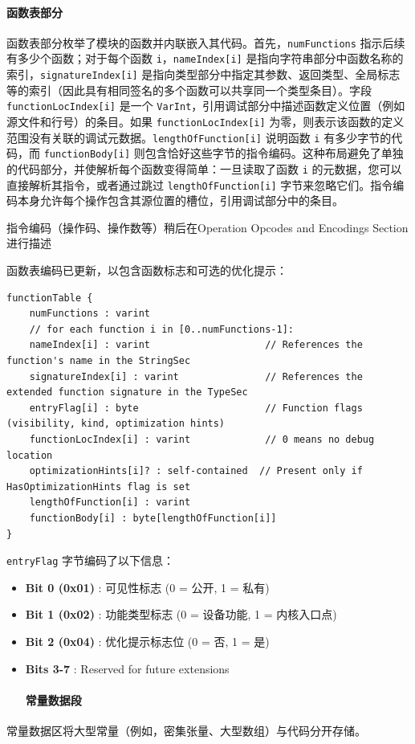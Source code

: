 \documentclass{article}
\begin{document}
\paragraph{函数表部分}

函数表部分枚举了模块的函数并内联嵌入其代码。首先，\texttt{numFunctions} 指示后续有多少个函数；对于每个函数 \texttt{i}，\texttt{nameIndex[i]} 是指向字符串部分中函数名称的索引，\texttt{signatureIndex[i]} 是指向类型部分中指定其参数、返回类型、全局标志等的索引（因此具有相同签名的多个函数可以共享同一个类型条目）。字段 \texttt{functionLocIndex[i]} 是一个 \texttt{VarInt}，引用调试部分中描述函数定义位置（例如源文件和行号）的条目。如果 \texttt{functionLocIndex[i]} 为零，则表示该函数的定义范围没有关联的调试元数据。\texttt{lengthOfFunction[i]} 说明函数 \texttt{i} 有多少字节的代码，而 \texttt{functionBody[i]} 则包含恰好这些字节的指令编码。这种布局避免了单独的代码部分，并使解析每个函数变得简单：一旦读取了函数 \texttt{i} 的元数据，您可以直接解析其指令，或者通过跳过 \texttt{lengthOfFunction[i]} 字节来忽略它们。指令编码本身允许每个操作包含其源位置的槽位，引用调试部分中的条目。


指令编码（操作码、操作数等）稍后在Operation Opcodes and Encodings Section进行描述


函数表编码已更新，以包含函数标志和可选的优化提示：


\begin{lstlisting}
functionTable {
    numFunctions : varint
    // for each function i in [0..numFunctions-1]:
    nameIndex[i] : varint                    // References the function's name in the StringSec
    signatureIndex[i] : varint               // References the extended function signature in the TypeSec
    entryFlag[i] : byte                      // Function flags (visibility, kind, optimization hints)
    functionLocIndex[i] : varint             // 0 means no debug location
    optimizationHints[i]? : self-contained  // Present only if HasOptimizationHints flag is set
    lengthOfFunction[i] : varint
    functionBody[i] : byte[lengthOfFunction[i]]
}
\end{lstlisting}

\texttt{entryFlag} 字节编码了以下信息：


\begin{itemize}
\item \textbf{Bit 0 (0x01)} : 可见性标志 (0 = 公开, 1 = 私有)
\item \textbf{Bit 1 (0x02)} : 功能类型标志 (0 = 设备功能, 1 = 内核入口点)
\item \textbf{Bit 2 (0x04)} : 优化提示标志位 (0 = 否, 1 = 是)
\item \textbf{Bits 3-7} : Reserved for future extensions


\paragraph{常量数据段}

\end{itemize}
常量数据区将大型常量（例如，密集张量、大型数组）与代码分开存储。
\end{document}
